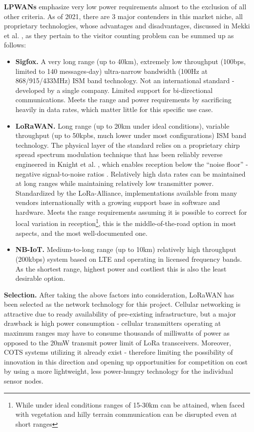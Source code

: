 \documentclass[10pt,nocopyrightspace]{ewsn-proc}
\begin{document}
\textbf{LPWANs} emphasize very low power requirements almost to the exclusion of all other criteria. As of 2021, there are 3 major contenders in this market niche, all proprietary technologies, whose advantages and disadvantages, discussed in Mekki et al. \cite{LPWAN-compare}, as they pertain to the visitor counting problem can be summed up as follows:
\begin{itemize}
\item \textbf{Sigfox.} A very long range (up to 40km), extremely low throughput (100bps, limited to 140 messages-day) ultra-narrow bandwidth (100Hz at 868/915/433MHz) ISM band technology. Not an international standard - developed by a single company. Limited support for bi-directional communications. Meets the range and power requirements by sacrificing heavily in data rates, which matter little for this specific use case. 
\item \textbf{LoRaWAN.} Long range (up to 20km under ideal conditions), variable throughput (up to 50kpbs, much lower under most configurations) ISM band technology. The physical layer of the standard relies on a proprietary chirp spread spectrum modulation technique that has been reliably reverse engineered in Knight et al. \cite{Lora-decode}, which enables reception below the “noise floor” - negative signal-to-noise ratios \cite{Lora-docs}. Relatively high data rates can be maintained at long ranges while maintaining relatively low transmitter power. Standardized by the LoRa-Alliance, implementations available from many vendors internationally with a growing support base in software and hardware. Meets the range requirements assuming it is possible to correct for local variation in reception\footnote{While under ideal conditions\cite{LORAWAN-optimal} ranges of 15-30km can be attained, when faced with vegetation and hilly terrain communication can be disrupted even at short ranges\cite{LORAWAN-hills}}, this is the middle-of-the-road option in most aspects, and the most well-documented one.
\item \textbf{NB-IoT.} Medium-to-long range (up to 10km) relatively high throughput (200kbps) system based on LTE and operating in licensed frequency bands. As the shortest range, highest power and costliest this is also the least desirable option.
\end{itemize}

\textbf{Selection.} After taking the above factors into consideration, LoRaWAN has been selected as the network technology for this project. Cellular networking is attractive due to ready availability of pre-existing infrastructure, but a major drawback is high power consumption - cellular transmitters operating at maximum ranges may have to consume thousands of milliwatts of power as opposed to the 20mW transmit power limit of LoRa transceivers. \cite{Lora-docs} Moreover, COTS systems utilizing it already exist - therefore limiting the possibility of innovation in this direction and opening up opportunities for competition on cost by using a more lightweight, less power-hungry technology for the individual sensor nodes. 
\end{document}
